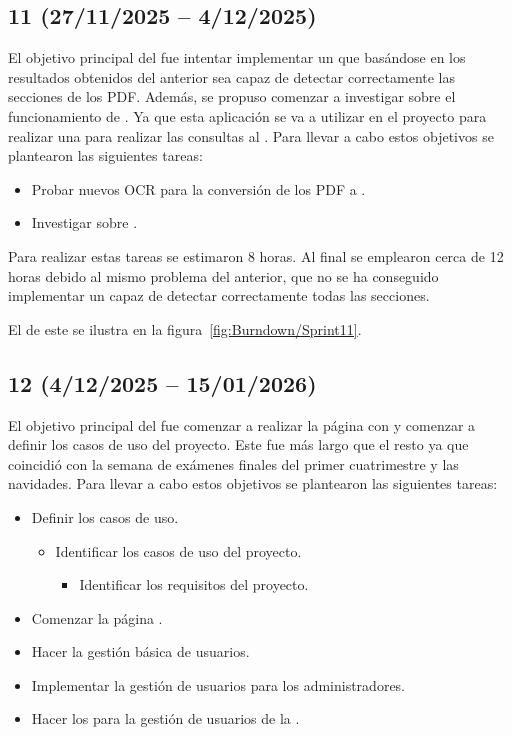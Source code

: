 \subsection{ 11 (27/11/2025 -- 4/12/2025)}
El objetivo principal del  fue intentar implementar un  que basándose en los resultados obtenidos del anterior sea capaz de detectar correctamente las secciones de los PDF. Además, se propuso comenzar a investigar sobre el funcionamiento de . Ya que esta aplicación se va a utilizar en el proyecto para realizar una  para realizar las consultas al . Para llevar a cabo estos objetivos se plantearon las siguientes tareas:
\begin{itemize}
\tightlist
	\item Probar nuevos OCR para la conversión de los PDF a .
	\item Investigar sobre .
\end{itemize}

Para realizar estas tareas se estimaron 8 horas. Al final se emplearon cerca de 12 horas debido al mismo problema del  anterior, que no se ha conseguido implementar un  capaz de detectar correctamente todas las secciones.

El  de este  se ilustra en la figura~\ref{fig:Burndown/Sprint11}.

\subsection{ 12 (4/12/2025 -- 15/01/2026)}
El objetivo principal del  fue comenzar a realizar la página  con  y comenzar a definir los casos de uso del proyecto. Este  fue más largo que el resto ya que coincidió con la semana de exámenes finales del primer cuatrimestre y las navidades. Para llevar a cabo estos objetivos se plantearon las siguientes tareas:
\begin{itemize}
\tightlist
	\item Definir los casos de uso.
	\begin{itemize}
	\tightlist
		\item Identificar los casos de uso del proyecto.
		\begin{itemize}
		\tightlist
			\item Identificar los requisitos del proyecto.
		\end{itemize}
	\end{itemize}
	\item Comenzar la página .
	\item Hacer la gestión básica de usuarios.
	\item Implementar la gestión de usuarios para los administradores.
	\item Hacer los  para la gestión de usuarios de la .
\end{itemize}

